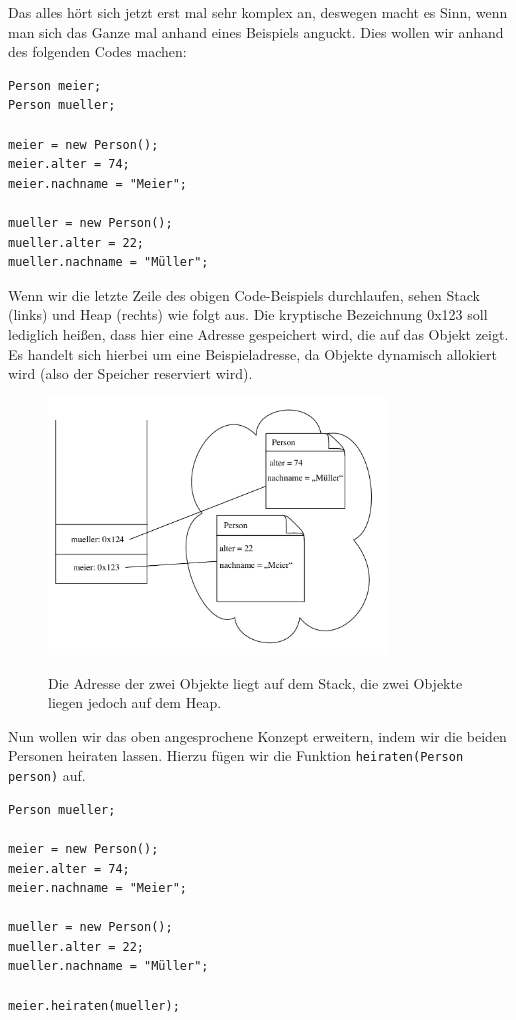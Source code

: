 Das alles hört sich jetzt erst mal sehr komplex an, deswegen macht es Sinn, wenn man sich das Ganze mal anhand eines Beispiels anguckt. Dies wollen wir anhand des folgenden Codes machen:

\begin{lstlisting}
Person meier;
Person mueller;

meier = new Person();
meier.alter = 74;
meier.nachname = "Meier";

mueller = new Person();
mueller.alter = 22;
mueller.nachname = "Müller";
\end{lstlisting}

Wenn wir die letzte Zeile des obigen Code-Beispiels durchlaufen, sehen Stack (links) und Heap (rechts) wie folgt aus. Die kryptische Bezeichnung 0x123 soll lediglich heißen, dass hier eine Adresse gespeichert wird, die auf das Objekt zeigt. Es handelt sich hierbei um eine Beispieladresse, da Objekte dynamisch allokiert wird (also der Speicher reserviert wird).

\begin{figure}[htbp!] 
\centering    
\includegraphics[width=0.8\textwidth]{stackheap_1}
\label{fig:stackheap1}
\caption{Die Adresse der zwei Objekte liegt auf dem Stack, die zwei Objekte liegen jedoch auf dem Heap.}
\end{figure}

Nun wollen wir das oben angesprochene Konzept erweitern, indem wir die beiden Personen heiraten lassen. Hierzu fügen wir die Funktion \texttt{heiraten(Person person)} auf.

\begin{lstlisting}
Person mueller;

meier = new Person();
meier.alter = 74;
meier.nachname = "Meier";

mueller = new Person();
mueller.alter = 22;
mueller.nachname = "Müller";

meier.heiraten(mueller);
\end{lstlisting}

